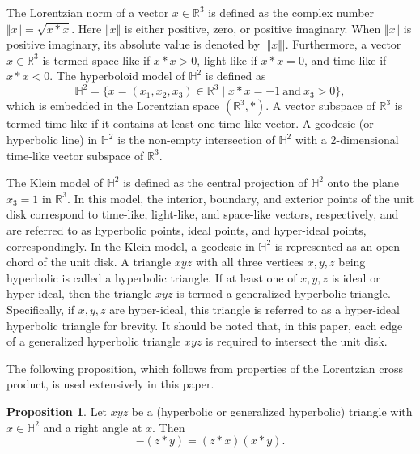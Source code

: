 \documentclass[12pt]{amsart}
\theoremstyle{definition}
\newtheorem{proposition}[theorem]{Proposition}
\begin{document}
The Lorentzian norm of a vector $x\in \mathbb{R}^3$ is defined as the complex number $\Vert x \Vert=\sqrt{x*x}$.
Here $\Vert x \Vert$ is either positive, zero, or positive imaginary.
When $\Vert x \Vert$ is positive imaginary, its absolute value is denoted by $\vert\Vert x \Vert\vert$.
Furthermore, a vector $x\in \mathbb{R}^3$ is termed space-like if $x*x>0$, light-like if $x*x=0$, and time-like if $x*x<0$.
The hyperboloid model of $\mathbb{H}^2$ is defined as
\begin{equation*}
\mathbb{H}^2=\{x=(x_1,x_2,x_3)\in \mathbb{R}^3\mid x*x=-1\ \text{and}\ x_3>0 \},
\end{equation*}
which is embedded in the Lorentzian space $(\mathbb{R}^3,*)$.
A vector subspace of $\mathbb{R}^3$ is termed time-like if it contains at least one time-like vector.
A geodesic (or hyperbolic line) in $\mathbb{H}^2$ is the non-empty intersection of $\mathbb{H}^2$ with a 2-dimensional time-like vector subspace of $\mathbb{R}^3$.

The Klein model of $\mathbb{H}^2$ is defined as the central projection of $\mathbb{H}^2$ onto the plane $x_3=1$ in $\mathbb{R}^3$. 
In this model, the interior, boundary, and exterior points of the unit disk correspond to time-like, light-like, and space-like vectors, respectively, and are referred to as hyperbolic points, ideal points, and hyper-ideal points, correspondingly.  
In the Klein model, a geodesic in $\mathbb{H}^2$ is represented as an open chord of the unit disk.
A triangle $xyz$ with all three vertices $x,y,z$ being hyperbolic is called a hyperbolic triangle.
If at least one of $x,y,z$ is ideal or hyper-ideal,
then the triangle $xyz$ is termed a generalized hyperbolic triangle.
Specifically, if $x,y,z$ are hyper-ideal, this triangle is referred to as a hyper-ideal hyperbolic triangle for brevity.
It should be noted that, in this paper, each edge of a generalized hyperbolic triangle $xyz$ is required to intersect the unit disk.

The following proposition, which follows from properties of the Lorentzian cross product, is used extensively in this paper.

\begin{proposition}\label{Prop: Right angle}
Let $xyz$ be a (hyperbolic or generalized hyperbolic) triangle with $x\in\mathbb{H}^2$ and a right angle at $x$. Then
\begin{equation*}
-(z*y)=(z*x)(x*y).
\end{equation*}
\end{proposition}
\end{document}
